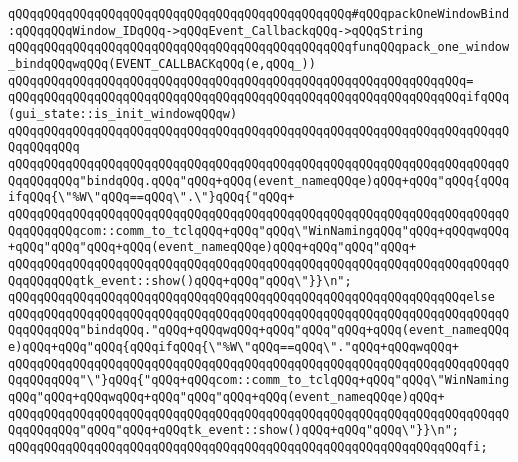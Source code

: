 \newline
\verb|qQQqqQQqqQQqqQQqqQQqqQQqqQQqqQQqqQQqqQQqqQQqqQQq#qQQqpackOneWindowBind:qQQqqQQqWindow_IDqQQq->qQQqEvent_CallbackqQQq->qQQqString|\newline
\newline
\verb|qQQqqQQqqQQqqQQqqQQqqQQqqQQqqQQqqQQqqQQqqQQqqQQqfunqQQqpack_one_window_bindqQQqwqQQq(EVENT_CALLBACKqQQq(e,qQQq_))|\newline
\verb|qQQqqQQqqQQqqQQqqQQqqQQqqQQqqQQqqQQqqQQqqQQqqQQqqQQqqQQqqQQqqQQq=|\newline
\verb|qQQqqQQqqQQqqQQqqQQqqQQqqQQqqQQqqQQqqQQqqQQqqQQqqQQqqQQqqQQqqQQqifqQQq(gui_state::is_init_windowqQQqw)|\newline
\verb|qQQqqQQqqQQqqQQqqQQqqQQqqQQqqQQqqQQqqQQqqQQqqQQqqQQqqQQqqQQqqQQqqQQqqQQqqQQqqQQq|\newline
\verb|qQQqqQQqqQQqqQQqqQQqqQQqqQQqqQQqqQQqqQQqqQQqqQQqqQQqqQQqqQQqqQQqqQQqqQQqqQQqqQQq"bindqQQq.qQQq"qQQq+qQQq(event_nameqQQqe)qQQq+qQQq"qQQq{qQQqifqQQq{\"%W\"qQQq==qQQq\".\"}qQQq{"qQQq+|\newline
\verb|qQQqqQQqqQQqqQQqqQQqqQQqqQQqqQQqqQQqqQQqqQQqqQQqqQQqqQQqqQQqqQQqqQQqqQQqqQQqqQQqcom::comm_to_tclqQQq+qQQq"qQQq\"WinNamingqQQq"qQQq+qQQqwqQQq+qQQq"qQQq"qQQq+qQQq(event_nameqQQqe)qQQq+qQQq"qQQq"qQQq+|\newline
\verb|qQQqqQQqqQQqqQQqqQQqqQQqqQQqqQQqqQQqqQQqqQQqqQQqqQQqqQQqqQQqqQQqqQQqqQQqqQQqqQQqtk_event::show()qQQq+qQQq"qQQq\"}}\n";|\newline
\verb|qQQqqQQqqQQqqQQqqQQqqQQqqQQqqQQqqQQqqQQqqQQqqQQqqQQqqQQqqQQqqQQqelse|\newline
\verb|qQQqqQQqqQQqqQQqqQQqqQQqqQQqqQQqqQQqqQQqqQQqqQQqqQQqqQQqqQQqqQQqqQQqqQQqqQQqqQQq"bindqQQq."qQQq+qQQqwqQQq+qQQq"qQQq"qQQq+qQQq(event_nameqQQqe)qQQq+qQQq"qQQq{qQQqifqQQq{\"%W\"qQQq==qQQq\"."qQQq+qQQqwqQQq+|\newline
\verb|qQQqqQQqqQQqqQQqqQQqqQQqqQQqqQQqqQQqqQQqqQQqqQQqqQQqqQQqqQQqqQQqqQQqqQQqqQQqqQQq"\"}qQQq{"qQQq+qQQqcom::comm_to_tclqQQq+qQQq"qQQq\"WinNamingqQQq"qQQq+qQQqwqQQq+qQQq"qQQq"qQQq+qQQq(event_nameqQQqe)qQQq+|\newline
\verb|qQQqqQQqqQQqqQQqqQQqqQQqqQQqqQQqqQQqqQQqqQQqqQQqqQQqqQQqqQQqqQQqqQQqqQQqqQQqqQQq"qQQq"qQQq+qQQqtk_event::show()qQQq+qQQq"qQQq\"}}\n";|\newline
\verb|qQQqqQQqqQQqqQQqqQQqqQQqqQQqqQQqqQQqqQQqqQQqqQQqqQQqqQQqqQQqqQQqfi;|\newline
\newline
\newline
\newline
